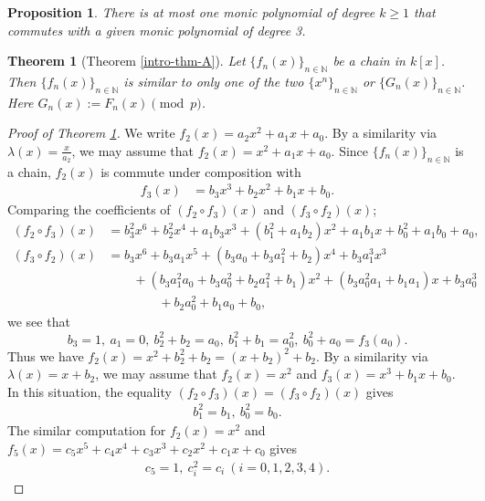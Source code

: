 \documentclass[10pt,a4paper]{amsart}
\newtheorem{thm}{Theorem}
\newtheorem{prop}{Proposition}
\newcommand{\N}{\mathbb{N}}
\begin{document}
\begin{prop}\label{prop-A2}
There is at most one monic polynomial of degree $k\geq 1$ that commutes with a given monic polynomial of degree 3.
\end{prop}

\begin{thm}[Theorem \ref{intro-thm-A}]\label{thm-A}
Let $\{f_n(x)\}_{n \in \N}$ be a chain in $k[x]$.
Then $\{f_n(x)\}_{n \in \N}$ is similar to only one of the two $\{ x^n\}_{n\in\N}$ or $\{G_n(x)\}_{n\in\N}$.
Here $G_n(x):=F_n(x) \pmod p$.
\end{thm}

\begin{proof}[Proof of Theorem \ref{thm-A}]
We write $f_2(x)=a_2x^2+a_1x+a_0$.
By a similarity via $\lambda(x)=\frac{x}{a_2}$, we may assume that $f_2(x)=x^2+a_1x+a_0$.
Since $\{f_n(x)\}_{n\in \N}$ is a chain, $f_2(x)$ is commute under composition with
\begin{align*}
f_3(x)&=b_3x^3+b_2x^2+b_1x+b_0.
\end{align*}
Comparing the coefficients of $(f_2\circ f_3)(x)$ and $(f_3\circ f_2)(x)$;
\begin{align*}
(f_2\circ f_3)(x)&=b_3^2x^6+b_2^2x^4+a_1b_3x^3+(b_1^2+a_1b_2)x^2+a_1b_1x+b_0^2+a_1b_0+a_0,\\
(f_3\circ f_2)(x)&=b_3x^6+b_3a_1x^5+(b_3a_0+b_3a_1^2+b_2)x^4+b_3a_1^3x^3\\
&\qquad +(b_3a_1^2a_0+b_3a_0^2+b_2a_1^2+b_1)x^2+(b_3a_0^2a_1+b_1a_1)x+b_3a_0^3\\
&\qquad \qquad  +b_2a_0^2+b_1a_0+b_0,
\end{align*}
we see that 
\[
b_3=1,\ a_1=0,\ b_2^2+b_2=a_0,\ b_1^2+b_1=a_0^2,\ b_0^2+a_0=f_3(a_0).
\]
Thus we have $f_2(x)=x^2+b_2^2+b_2=(x+b_2)^2+b_2$.
By a similarity via $\lambda(x)=x+b_2$, we may assume that $f_2(x)=x^2$ and $f_3(x)=x^3+b_1x+b_0$.
In this situation, the equality $(f_2\circ f_3)(x)=(f_3\circ f_2)(x)$ gives
\begin{align}\label{f_3-coef}
b_1^2=b_1,\ b_0^2=b_0.
\end{align}
The similar computation for $f_2(x)=x^2$ and $f_5(x)=c_5x^5+c_4x^4+c_3x^3+c_2x^2+c_1x+c_0$ gives
\begin{align}\label{f_5-coef}
c_5=1,\ c_i^2=c_i\ (i=0,1,2,3,4).
\end{align}


\end{proof}
\end{document}

